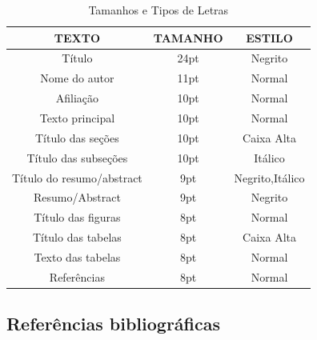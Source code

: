 \begin{table}[h]
\caption{Tamanhos e Tipos de Letras}
\label{tab:tabela1}
\begin{adjustbox}{max width=\textwidth}
\begin{tabular}{|c|c|c|}
\hline
TEXTO & TAMANHO & ESTILO \\ \hline\hline
Título                      & 24pt                         & Negrito                     \\
Nome do autor               & 11pt                         & Normal                      \\
Afiliação                   & 10pt                         & Normal                      \\
Texto principal             & 10pt                         & Normal                      \\
Título das seções           & 10pt                         & Caixa Alta                  \\
Título das subseções        & 10pt                         & Itálico                     \\
Título do resumo/abstract   & 9pt                          & Negrito,Itálico             \\
Resumo/Abstract             & 9pt                          & Negrito                     \\
Título das figuras          & 8pt                          & Normal                      \\
Título das tabelas          & 8pt                          & Caixa Alta                  \\
Texto das tabelas           & 8pt                          & Normal                      \\
Referências                 & 8pt                          & Normal                      \\ \hline
\end{tabular}
\end{adjustbox}
\end{table}



\subsection{Referências bibliográficas}

